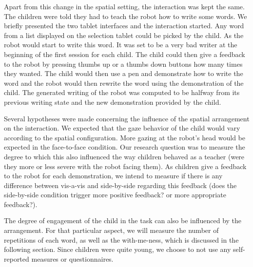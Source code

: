 \documentclass[letterpaper, 10 pt, conference]{ieeeconf}  %
\begin{document}
Apart from this change in the spatial setting, the interaction was kept the same. 
The children were told they had to teach the robot how to write some words. 
We briefly presented the two tablet interfaces and the interaction started.
Any word from a list displayed on the selection tablet could be picked by the child.
As the robot would start to write this word. It was set to be a very bad writer at the beginning of the first session for each child.
The child could then give a feedback to the robot by pressing thumbs up or a thumbs down buttons how many times they wanted.
The child would then use a pen and demonstrate how to write the word and the robot would then rewrite the word using the demonstration of the child.
The generated writing of the robot was computed to be halfway from its previous writing state and the new demonstration provided by the child.

Several hypotheses were made concerning the influence of the spatial arrangement on the interaction.
We expected that the gaze behavior of the child would vary according to the spatial configuration.
More gazing at the robot's head would be expected in the face-to-face condition.
Our research question was to measure the degree to which this also influenced the way children behaved as a teacher (were they more or less severe with the robot facing them).
As children give a feedback to the robot for each demonstration, we intend to measure if there is any difference between vis-a-vis and side-by-side regarding this feedback (does the side-by-side condition trigger more positive feedback? or more appropriate feedback?).

The degree of  engagement of the child in the task can also be influenced by the arrangement.
For that particular aspect, we will measure the number of repetitions of each word, as well as the with-me-ness, which is discussed in the following section.
Since children were quite young, we choose to not use any self-reported measures or questionnaires.
\end{document}
